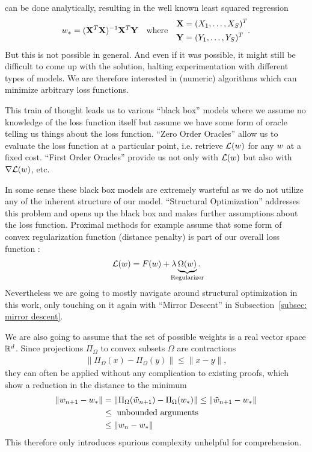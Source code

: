 can be done analytically, resulting in the well known least squared
regression
\begin{align*}
	w_* = (\mathbf{X}^T\mathbf{X})^{-1}\mathbf{X}^T\mathbf{Y} \quad \text{where}\quad 
	\begin{aligned}
		\mathbf{X}&=(X_1,\dots,X_S)^T\\
		\mathbf{Y}&=(Y_1,\dots,Y_S)^T
	\end{aligned}.
\end{align*}
But this is not possible in general. And even if it was possible, it might still
be difficult to come up with the solution, halting experimentation
with different types of models. We are therefore interested in (numeric)
algorithms which can minimize arbitrary loss functions.

This train of thought leads us to various ``black box'' models where we assume
no knowledge of the loss function itself but assume we have some form of oracle
telling us things about the loss function. ``Zero Order Oracles'' allow us to
evaluate the loss function at a particular point, i.e. retrieve \(\mathcal{L}(w)\)
for any \(w\) at a fixed cost. ``First Order Oracles'' provide us not
only with \(\mathcal{L}(w)\) but also with \(\nabla\mathcal{L}(w)\), etc.

In some sense these black box models are extremely wasteful as we do not utilize
any of the inherent structure of our model. ``Structural Optimization'' addresses
this problem and opens up the black box and makes further assumptions about
the loss function. Proximal methods for example assume that some form of convex
regularization function (distance penalty) is part of our overall loss
function \parencite[see e.g.][]{bottouOptimizationMethodsLargeScale2018}:
\begin{align*}
	\Loss(\weights)
	= F(\weights) + \lambda \underbrace{\Omega(\weights)}_{\mathclap{\text{Regularizer}}}.
\end{align*}
Nevertheless we are going to mostly navigate around structural optimization in
this work, only touching on it again with ``Mirror Descent'' in
Subsection~\ref{subsec: mirror descent}.

We are also going to assume that the set of possible weights is a real
vector space \(\mathbb{R}^d\). Since projections \(\Pi_\Omega\) to convex
subsets \(\Omega\) are contractions \parencite[Lemma
3.1]{bubeckConvexOptimizationAlgorithms2015}
\begin{align*}
	\| \Pi_\Omega(x) - \Pi_\Omega(y) \| \le \| x - y \|,
\end{align*}
they can often be applied without any complication to existing proofs, which show
a reduction in the distance to the minimum
\begin{align*}
	\|w_{n+1} - w_* \|
	&= \|\Pi_\Omega(\tilde{w}_{n+1}) - \Pi_\Omega(w_*)\|
	\le \|\tilde{w}_{n+1} - w_* \|\\
	&\le \text{ unbounded arguments }\\
	&\le \|w_n - w_*\|
\end{align*}
This therefore only introduces spurious complexity unhelpful for comprehension.

